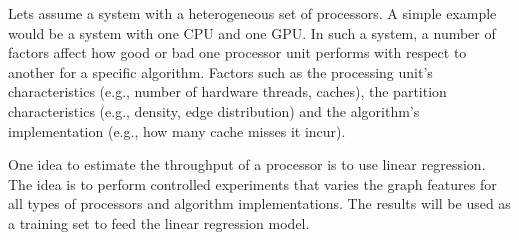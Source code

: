 
Lets assume a system with a heterogeneous set of processors. A simple example would be a system with one CPU and one GPU. In such a system, a number of factors affect how good or bad one processor unit performs with respect to another for a specific algorithm. Factors such as the processing unit's characteristics (e.g., number of hardware threads, caches), the partition characteristics (e.g., density, edge distribution) and the algorithm's implementation (e.g., how many cache misses it incur).

One idea to estimate the throughput of a processor is to use linear regression. The idea is to perform controlled experiments that varies the graph features for all types of processors and algorithm implementations. The results will be used as a training set to feed the linear regression model.
